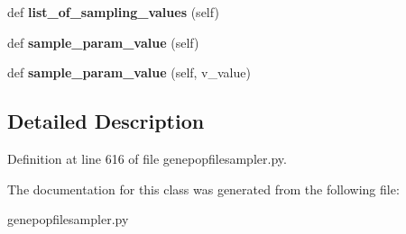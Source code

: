 \begin{DoxyCompactItemize}
\item 
def {\bfseries list\+\_\+of\+\_\+sampling\+\_\+values} (self)\hypertarget{classnegui_1_1genepopfilesampler_1_1GenepopFileSampleParamsCohorts_a630cf53262bfee15371fd78a10984a5a}{}\label{classnegui_1_1genepopfilesampler_1_1GenepopFileSampleParamsCohorts_a630cf53262bfee15371fd78a10984a5a}

\item 
def {\bfseries sample\+\_\+param\+\_\+value} (self)\hypertarget{classnegui_1_1genepopfilesampler_1_1GenepopFileSampleParamsCohorts_a9e9c2215d13b79382ce6855185650097}{}\label{classnegui_1_1genepopfilesampler_1_1GenepopFileSampleParamsCohorts_a9e9c2215d13b79382ce6855185650097}

\item 
def {\bfseries sample\+\_\+param\+\_\+value} (self, v\+\_\+value)\hypertarget{classnegui_1_1genepopfilesampler_1_1GenepopFileSampleParamsCohorts_a74b4e7bc1e2bf457ce368e518f8d99d5}{}\label{classnegui_1_1genepopfilesampler_1_1GenepopFileSampleParamsCohorts_a74b4e7bc1e2bf457ce368e518f8d99d5}

\end{DoxyCompactItemize}


\subsection{Detailed Description}


Definition at line 616 of file genepopfilesampler.\+py.



The documentation for this class was generated from the following file\+:\begin{DoxyCompactItemize}
\item 
genepopfilesampler.\+py\end{DoxyCompactItemize}
